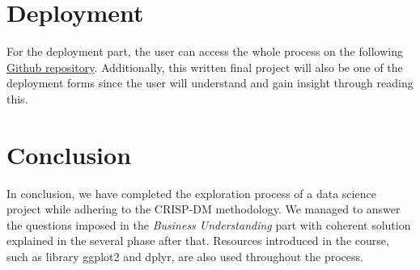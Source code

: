 \documentclass[12pt,]{article}
\begin{document}
\hypertarget{deployment}{%
\section{Deployment}\label{deployment}}

For the deployment part, the user can access the whole process on the
following \href{https://github.com/c1040783/CSC8631}{Github repository}.
Additionally, this written final project will also be one of the
deployment forms since the user will understand and gain insight through
reading this.

\hypertarget{conclusion}{%
\section{Conclusion}\label{conclusion}}

In conclusion, we have completed the exploration process of a data
science project while adhering to the CRISP-DM methodology. We managed
to answer the questions imposed in the \emph{Business Understanding}
part with coherent solution explained in the several phase after that.
Resources introduced in the course, such as library ggplot2 and dplyr,
are also used throughout the process.





\newpage
\singlespacing 

\end{document}
